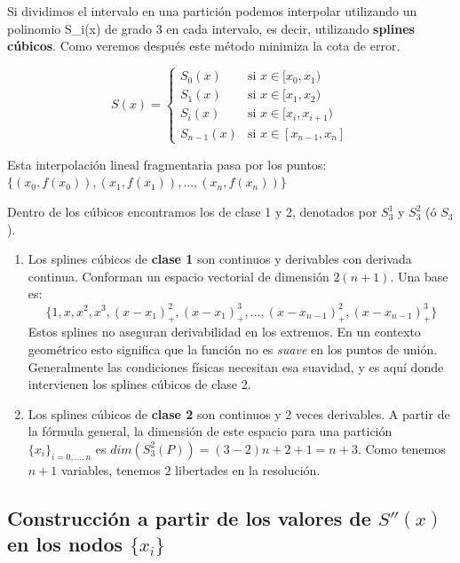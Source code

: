 \documentclass[11pt,spanish,]{article}
\theoremstyle{definition} \newtheorem*{definicion}{Definición}
\begin{document}
Si dividimos el intervalo en una partición podemos interpolar utilizando
un polinomio S\_i(x) de grado 3 en cada intervalo, es decir, utilizando
\textbf{splines cúbicos}. Como veremos después este método minimiza la
cota de error.

\begin{equation}
    S(x) =
    \begin{cases}
    S_0(x)          & \text{si } x \in {[x_0,x_1)} \\
    S_1(x)          & \text{si } x \in {[x_1,x_2)} \\
    S_i(x)          & \text{si } x \in {[x_i,x_{i+1})} \\
    S_{n-1}(x)      & \text{si } x \in {[x_{n-1},x_n]}
    \end{cases}
\end{equation}

Esta interpolación lineal fragmentaria pasa por los puntos:
${ \{ (x_0,f(x_0)),(x_1,f(x_1)),...,(x_n,f(x_n)) \} }$

Dentro de los cúbicos encontramos los de clase 1 y 2, denotados por
$S^{1}_3$ y $S^{2}_3$ (ó $S_3$).

\begin{enumerate}
\def\labelenumi{\arabic{enumi}.}
\item
  Los splines cúbicos de \textbf{clase 1} son continuos y derivables con
  derivada continua. Conforman un espacio vectorial de dimensión
  $2(n+1)$. Una base es:
  \[\{1,x,x^2,x^3, (x-x_1)^{2}_{+},(x-x_1)^{3}_{+},...,(x-x_{n-1})^{2}_{+},(x-x_{n-1})^3_+ \}\]
  Estos splines no aseguran derivabilidad en los extremos. En un
  contexto geométrico esto significa que la función no es \emph{suave}
  en los puntos de unión. Generalmente las condiciones físicas necesitan
  esa suavidad, y es aquí donde intervienen los splines cúbicos de clase
  2.
\item
  Los splines cúbicos de \textbf{clase 2} son continuos y 2 veces
  derivables. A partir de la fórmula general, la dimensión de este
  espacio para una partición $\{x_i\}_{i=0,...,n}$ es
  $dim (S_3^2(P)) = (3-2)n+2+1=n+3$. Como tenemos $n+1$ variables,
  tenemos $2$ libertades en la resolución.
\end{enumerate}

\subsection{Construcción a partir de los valores de $S''(x)$ en los
nodos
$\{x_i\}$}\label{construcciuxf3n-a-partir-de-los-valores-de-sx-en-los-nodos-xux5fi}
\end{document}
